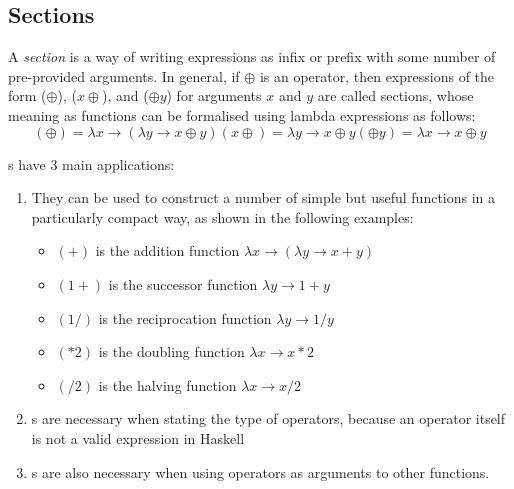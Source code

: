\subsection{Sections}\label{subsec:Sections}
\begin{definition}[Section]\label{def:Section}
  A \emph{section} is a way of writing expressions as infix or prefix with some number of pre-provided arguments.
  In general, if $\oplus$ is an operator, then expressions of the form ($\oplus$), ($x \oplus$), and ($\oplus y$) for arguments $x$ and $y$ are called sections, whose meaning as functions can be formalised using lambda expressions as follows:
  \begin{subequations}\label{eq:Section}
    \begin{equation}\label{subeq:Section_No_Params}
      (\oplus) = \lambda x \rightarrow (\lambda y \rightarrow x \oplus y)
    \end{equation}
    \begin{equation}\label{subeq:Section_First_Param}
      (x \oplus) = \lambda y \rightarrow x \oplus y
    \end{equation}
    \begin{equation}\label{subeq:Section_Second_Param}
      (\oplus y) = \lambda x \rightarrow x \oplus y
    \end{equation}
  \end{subequations}
\end{definition}

s have 3 main applications:
\begin{enumerate}[noitemsep]
\item They can be used to construct a number of simple but useful functions in a particularly compact way, as shown in the following examples:
  \begin{itemize}[noitemsep]
  \item $(+)$ is the addition function $\lambda x \rightarrow (\lambda y \rightarrow x + y )$
  \item $(1+)$ is the successor function $\lambda y \rightarrow 1 + y$
  \item $(1/)$ is the reciprocation function $\lambda y \rightarrow 1 / y$
  \item $(*2)$ is the doubling function $\lambda x \rightarrow x * 2$
  \item $(/2)$ is the halving function $\lambda x \rightarrow x / 2$
\end{itemize}
\item {}s are necessary when stating the type of operators, because an operator itself is not a valid expression in Haskell
\item {}s are also necessary when using operators as arguments to other functions.
\end{enumerate}

